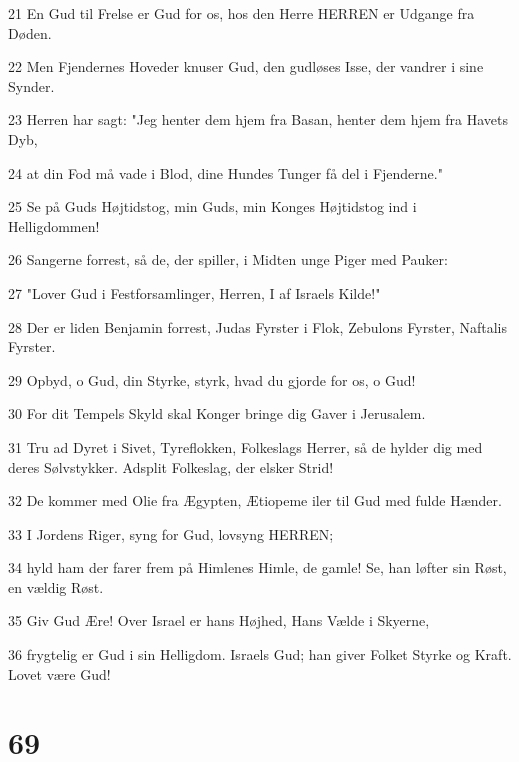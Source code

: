 \par 21 En Gud til Frelse er Gud for os, hos den Herre HERREN er Udgange fra Døden.
\par 22 Men Fjendernes Hoveder knuser Gud, den gudløses Isse, der vandrer i sine Synder.
\par 23 Herren har sagt: "Jeg henter dem hjem fra Basan, henter dem hjem fra Havets Dyb,
\par 24 at din Fod må vade i Blod, dine Hundes Tunger få del i Fjenderne."
\par 25 Se på Guds Højtidstog, min Guds, min Konges Højtidstog ind i Helligdommen!
\par 26 Sangerne forrest, så de, der spiller, i Midten unge Piger med Pauker:
\par 27 "Lover Gud i Festforsamlinger, Herren, I af Israels Kilde!"
\par 28 Der er liden Benjamin forrest, Judas Fyrster i Flok, Zebulons Fyrster, Naftalis Fyrster.
\par 29 Opbyd, o Gud, din Styrke, styrk, hvad du gjorde for os, o Gud!
\par 30 For dit Tempels Skyld skal Konger bringe dig Gaver i Jerusalem.
\par 31 Tru ad Dyret i Sivet, Tyreflokken, Folkeslags Herrer, så de hylder dig med deres Sølvstykker. Adsplit Folkeslag, der elsker Strid!
\par 32 De kommer med Olie fra Ægypten, Ætiopeme iler til Gud med fulde Hænder.
\par 33 I Jordens Riger, syng for Gud, lovsyng HERREN;
\par 34 hyld ham der farer frem på Himlenes Himle, de gamle! Se, han løfter sin Røst, en vældig Røst.
\par 35 Giv Gud Ære! Over Israel er hans Højhed, Hans Vælde i Skyerne,
\par 36 frygtelig er Gud i sin Helligdom. Israels Gud; han giver Folket Styrke og Kraft. Lovet være Gud!

\chapter{69}

